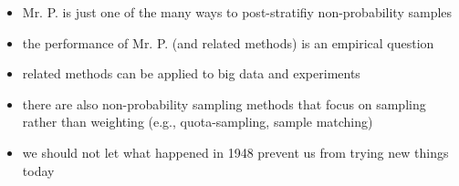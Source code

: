 \documentclass[aspectratio=169]{beamer}
\begin{document}
\begin{frame}

\begin{itemize}
\item Mr. P. is just one of the many ways to post-stratifiy non-probability samples
\pause
\item the performance of Mr. P. (and related methods) is an empirical question
\pause
\item related methods can be applied to big data and experiments
\pause
\item there are also non-probability sampling methods that focus on sampling rather than weighting (e.g., quota-sampling, sample matching)
\pause
\item we should not let what happened in 1948 prevent us from trying new things today
\end{itemize}

\end{frame}
\begin{frame}

\begin{center}
\end{center}

\end{frame}
\end{document}
